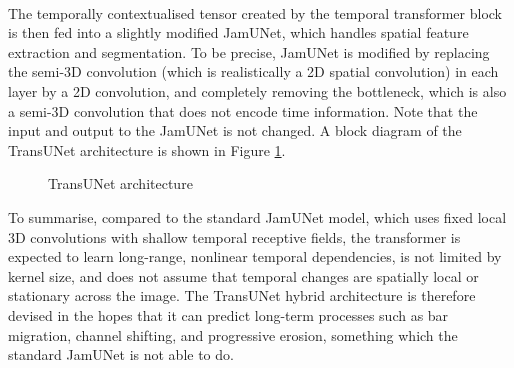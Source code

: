\documentclass[10pt,oneside,a4paper,english]{article}
\begin{document}
\\
The temporally contextualised tensor created by the temporal transformer block is then fed into a slightly modified JamUNet, which handles spatial feature extraction and segmentation. To be precise, JamUNet is modified by replacing the semi-3D convolution (which is realistically a 2D spatial convolution) in each layer by a 2D convolution, and completely removing the bottleneck, which is also a semi-3D convolution that does not encode time information. Note that the input and output to the JamUNet is not changed. A block diagram of the TransUNet architecture is shown in Figure \ref{fig: TransUNet block diagram}.
\begin{figure}[H]
    \centering
    \caption{TransUNet architecture}
    \label{fig: TransUNet block diagram}
\end{figure}
\noindent To summarise, compared to the standard JamUNet model, which uses fixed local 3D convolutions with shallow temporal receptive fields, the transformer is expected to learn long-range, nonlinear temporal dependencies, is not limited by kernel size, and does not assume that temporal changes are spatially local or stationary across the image. The TransUNet hybrid architecture is therefore devised in the hopes that it can predict long-term processes such as bar migration, channel shifting, and progressive erosion, something which the standard JamUNet is not able to do.
\end{document}
